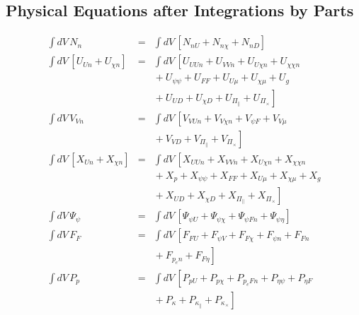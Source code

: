 \documentclass[letterpaper]{book}
\newcommand{\tensor}[1]{\mathsf{#1}}
\renewcommand{\P}{\tensor{\Pi}}
\begin{document}
\subsection{Physical Equations after Integrations by Parts}

\begin{subequations}
  \label{eq:equations_ibp}
\begin{eqnarray}
  \int dV\, N_n & = & \int dV\, \left[
    N_{n U} + N_{n \chi} + N_{n D} \right]
  \\
  \int dV\, \left[U_{U n} + U_{\chi n}\right] & = & \int dV\, 
  \left[ 
    U_{U U n} + U_{V V n} + U_{U \chi n} + U_{\chi \chi n} 
    \right. \\ && \nonumber \left. \mbox{} 
    + U_{\psi \psi} + U_{F F} + U_{U \mu} + U_{\chi \mu} + U_g
    \right. \\ && \nonumber \left. \mbox{} 
    + U_{U D} + U_{\chi D} + U_{\P_\parallel} + U_{\P_\times}
    \right]
  \\
  \int dV\, V_{V n} & = & \int dV\, \left[
    V_{V U n} + V_{V \chi n} + V_{\psi F} + V_{V \mu} 
    \right. \\ && \nonumber \left. \mbox{} + V_{V D}  
    + V_{\P_\parallel} + V_{\P_\times} \right]
  \\
  \int dV\, \left[X_{U n} + X_{\chi n}\right] & = & \int dV\, \left[
    X_{U U n}+ X_{V V n}+ X_{U \chi n}+ X_{\chi \chi n} 
    \right.\\  && \nonumber \left. \mbox{} 
    + X_p + X_{\psi \psi} + X_{F F} + X_{U \mu} + X_{\chi \mu} + X_g 
    \right. \\ && \nonumber \left. \mbox{} 
    + X_{U D} + X_{\chi D} + X_{\P_\parallel} + X_{\P_\times}
    \right]
  \\
  \int dV\, \Psi_\psi & = & \int dV\, \left[
    \Psi_{\psi U} + \Psi_{\psi \chi} + \Psi_{\psi F n}
    + \Psi_{\psi \eta} \right]
  \\
  \int dV\, F_F & = & \int dV\, \left[
    F_{F U} + F_{\psi V} + F_{F \chi} + F_{\psi n} + F_{F n} 
    \right. \\ && \nonumber \left. \mbox{} + F_{p_e n} + F_{F \eta} \right]
  \\
  \int dV\, P_p & = & \int dV\, \left[
    P_{p U} + P_{p \chi} + P_{p_e F n} + P_{\eta \psi} + P_{\eta F} 
    \right. \\ && \nonumber \left. \mbox{} 
    + P_\kappa + P_{\kappa_\parallel} + P_{\kappa_\times} \right]
\end{eqnarray}
\end{subequations}
\end{document}
